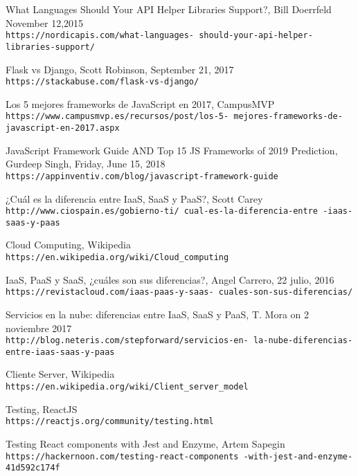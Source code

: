 \begin{thebibliography}{999}
What Languages Should Your API Helper Libraries Support?,  Bill Doerrfeld November 12,2015
\\\texttt{https://nordicapis.com/what-languages-
should-your-api-helper-libraries-support/}

Flask vs Django, Scott Robinson, September 21, 2017
\\\texttt{https://stackabuse.com/flask-vs-django/}

Los 5 mejores frameworks de JavaScript en 2017, CampusMVP
\\\texttt{https://www.campusmvp.es/recursos/post/los-5-
mejores-frameworks-de-javascript-en-2017.aspx}

JavaScript Framework Guide AND Top 15 JS Frameworks of 2019 Prediction, Gurdeep Singh, Friday, June 15, 2018
\\\texttt{https://appinventiv.com/blog/javascript-framework-guide}

¿Cuál es la diferencia entre IaaS, SaaS y PaaS?, Scott Carey
\\\texttt{http://www.ciospain.es/gobierno-ti/
cual-es-la-diferencia-entre
-iaas-saas-y-paas}

Cloud Computing, Wikipedia
\\\texttt{https://en.wikipedia.org/wiki/Cloud\_computing}

IaaS, PaaS y SaaS, ¿cuáles son sus diferencias?, Angel Carrero, 22 julio, 2016 
\\\texttt{https://revistacloud.com/iaas-paas-y-saas-
cuales-son-sus-diferencias/}

Servicios en la nube: diferencias entre IaaS, SaaS y PaaS,  T. Mora on 2 noviembre 2017 
\\\texttt{http://blog.neteris.com/stepforward/servicios-en-
la-nube-diferencias-entre-iaas-saas-y-paas}

Cliente Server, Wikipedia
\\\texttt{https://en.wikipedia.org/wiki/Client\_server\_model}

Testing, ReactJS
\\\texttt{https://reactjs.org/community/testing.html}

Testing React components with Jest and Enzyme, Artem Sapegin
\\\texttt{https://hackernoon.com/testing-react-components
-with-jest-and-enzyme-41d592c174f}


\end{thebibliography}
